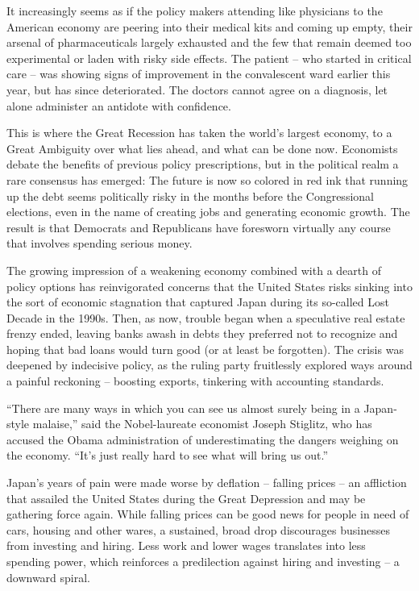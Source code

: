 ﻿\documentclass[12pt]{article}
\begin{document}
It increasingly seems as if the policy makers attending like physicians to the American economy are
peering into their medical kits and coming up empty, their arsenal of pharmaceuticals largely
exhausted and the few that remain deemed too experimental or laden with risky side effects. The
patient -- who started in critical care -- was showing signs of improvement in the convalescent ward
earlier this year, but has since deteriorated. The doctors cannot agree on a diagnosis, let alone
administer an antidote with confidence.

This is where the Great Recession has taken the world's largest economy, to a Great Ambiguity over
what lies ahead, and what can be done now. Economists debate the benefits of previous policy
prescriptions, but in the political realm a rare consensus has emerged: The future is now so colored
in red ink that running up the debt seems politically risky in the months before the Congressional
elections, even in the name of creating jobs and generating economic growth. The result is that
Democrats and Republicans have foresworn virtually any course that involves spending serious money.

The growing impression of a weakening economy combined with a dearth of policy options has
reinvigorated concerns that the United States risks sinking into the sort of economic stagnation
that captured Japan during its so-called Lost Decade in the 1990s. Then, as now, trouble began when
a speculative real estate frenzy ended, leaving banks awash in debts they preferred not to recognize
and hoping that bad loans would turn good (or at least be forgotten). The crisis was deepened by
indecisive policy, as the ruling party fruitlessly explored ways around a painful reckoning --
boosting exports, tinkering with accounting standards.

``There are many ways in which you can see us almost surely being in a Japan-style malaise,'' said
the Nobel-laureate economist Joseph Stiglitz, who has accused the Obama administration of
underestimating the dangers weighing on the economy. ``It's just really hard to see what will bring
us out.''

Japan's years of pain were made worse by deflation -- falling prices -- an affliction that assailed
the United States during the Great Depression and may be gathering force again. While falling prices
can be good news for people in need of cars, housing and other wares, a sustained, broad drop
discourages businesses from investing and hiring. Less work and lower wages translates into less
spending power, which reinforces a predilection against hiring and investing -- a downward spiral.
\end{document}
